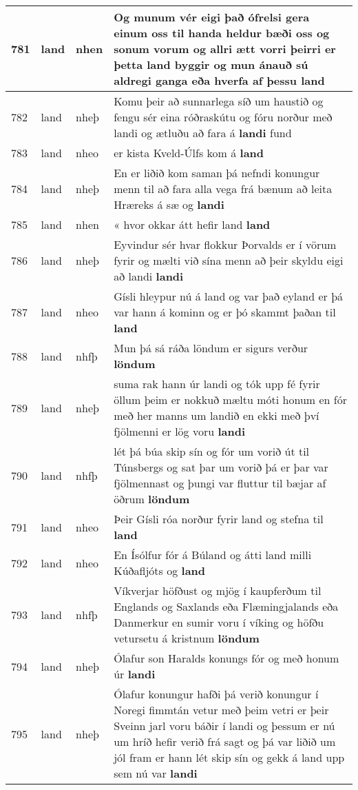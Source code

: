 \documentclass{article}
\begin{document}
\begin{longtable}{p{1cm}|p{1cm}|p{1cm}|p{13cm}}
\hline
781&land&nhen&Og munum vér eigi það ófrelsi gera einum oss til handa heldur bæði oss og sonum vorum og allri ætt vorri þeirri er þetta land byggir og mun ánauð sú aldregi ganga eða hverfa af þessu \textbf{land} \\
\hline
782&land&nheþ&Komu þeir að sunnarlega síð um haustið og fengu sér eina róðraskútu og fóru norður með landi og ætluðu að fara á \textbf{landi} fund\\
\hline
783&land&nheo&er kista Kveld-Úlfs kom á \textbf{land} \\
\hline
784&land&nheþ&En er liðið kom saman þá nefndi konungur menn til að fara alla vega frá bænum að leita Hræreks á sæ og \textbf{landi} \\
\hline
785&land&nhen&« hvor okkar átt hefir land \textbf{land} \\
\hline
786&land&nheþ&Eyvindur sér hvar flokkur Þorvalds er í vörum fyrir og mælti við sína menn að þeir skyldu eigi að landi \textbf{landi} \\
\hline
787&land&nheo&Gísli hleypur nú á land og var það eyland er þá var hann á kominn og er þó skammt þaðan til \textbf{land} \\
\hline
788&land&nhfþ&Mun þá sá ráða löndum er sigurs verður \textbf{löndum} \\
\hline
789&land&nheþ&suma rak hann úr landi og tók upp fé fyrir öllum þeim er nokkuð mæltu móti honum en fór með her manns um landið en ekki með því fjölmenni er lög voru \textbf{landi} \\
\hline
790&land&nhfþ&lét þá búa skip sín og fór um vorið út til Túnsbergs og sat þar um vorið þá er þar var fjölmennast og þungi var fluttur til bæjar af öðrum \textbf{löndum} \\
\hline
791&land&nheo&Þeir Gísli róa norður fyrir land og stefna til \textbf{land} \\
\hline
792&land&nheo&En Ísólfur fór á Búland og átti land milli Kúðafljóts og \textbf{land} \\
\hline
793&land&nhfþ&Víkverjar höfðust og mjög í kaupferðum til Englands og Saxlands eða Flæmingjalands eða Danmerkur en sumir voru í víking og höfðu vetursetu á kristnum \textbf{löndum} \\
\hline
794&land&nheþ&Ólafur son Haralds konungs fór og með honum úr \textbf{landi} \\
\hline
795&land&nheþ&Ólafur konungur hafði þá verið konungur í Noregi fimmtán vetur með þeim vetri er þeir Sveinn jarl voru báðir í landi og þessum er nú um hríð hefir verið frá sagt og þá var liðið um jól fram er hann lét skip sín og gekk á land upp sem nú var \textbf{landi} \\

\end{longtable}
\end{document}
